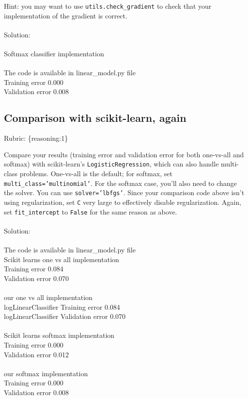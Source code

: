 \documentclass{article}
\def\rubric#1{\gre{Rubric: \{#1\}}}{}
\def\blu#1{{\color{blu}#1}}
\def\gre#1{{\color{gre}#1}}
\begin{document}
Hint: you may want to use \verb|utils.check_gradient| to check that your implementation of the gradient is correct. \\ \\
\blu{Solution: \\ \\
Softmax classifier implementation \\ \\
The code is available in linear\_model.py file \\
Training error 0.000 \\
Validation error 0.008 
}


\subsection{Comparison with scikit-learn, again}
\rubric{reasoning:1}

Compare your results (training error and validation error for both one-vs-all and softmax) with scikit-learn's \texttt{LogisticRegression}, 
which can also handle multi-class problems. 
One-vs-all is the default; for softmax, set \texttt{multi\string_class='multinomial'}. For the softmax case,
you'll also need to change the solver. You can use \texttt{solver='lbfgs'}.
Since your comparison code above isn't using regularization, set \texttt{C} very large to effectively disable regularization. 
Again, set \texttt{fit\string_intercept} to \texttt{False} for the same reason as above. \\ \\
\blu{Solution: \\ \\
The code is available in linear\_model.py file \\
Scikit learns one vs all implementation \\
Training error 0.084 \\  
Validation error 0.070 \\ \\
our one vs all implementation \\
logLinearClassifier Training error 0.084 \\
logLinearClassifier Validation error 0.070 \\ \\
Scikit learns softmax implementation \\
Training error 0.000 \\ 
Validation error 0.012 \\  \\
our softmax implementation \\ 
Training error 0.000 \\
Validation error 0.008
}
\end{document}
